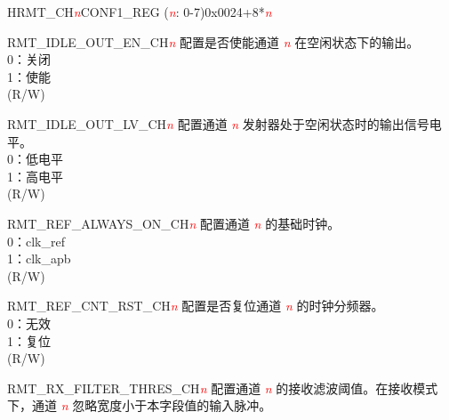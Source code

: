 \begin{register}{H}{RMT\_CH\textcolor{red}{\it{n}}CONF1\_REG (\textcolor{red}{\it{n}}: 0-7)}{0x0024+8*\textcolor{red}{\it{n}}}\label{regdesc:RMTCHnCONF1REG}
%
%
%
%
%
%
%
%
%
%
%
%
%
%
\regnewline%
\begin{regdesc}\begin{reglist}
\item [RMT\_IDLE\_OUT\_EN\_CH\textcolor{red}{\it{n}}] 配置是否使能通道 \textcolor{red}{\it{n}} 在空闲状态下的输出。\\
0：关闭\\
1：使能\\(R/W)
\item [RMT\_IDLE\_OUT\_LV\_CH\textcolor{red}{\it{n}}] 配置通道 \textcolor{red}{\it{n}} 发射器处于空闲状态时的输出信号电平。\\
0：低电平\\
1：高电平\\(R/W)
\item [RMT\_REF\_ALWAYS\_ON\_CH\textcolor{red}{\it{n}}] 配置通道 \textcolor{red}{\it{n}} 的基础时钟。\\
0：clk\_ref\\
1：clk\_apb\\(R/W)
\item [RMT\_REF\_CNT\_RST\_CH\textcolor{red}{\it{n}}] 配置是否复位通道 \textcolor{red}{\it{n}} 的时钟分频器。\\
0：无效\\
1：复位\\(R/W)
\item [RMT\_RX\_FILTER\_THRES\_CH\textcolor{red}{\it{n}}] 配置通道 \textcolor{red}{\it{n}} 的接收滤波阈值。在接收模式下，通道 \textcolor{red}{\it{n}} 忽略宽度小于本字段值的输入脉冲。\\

\end{reglist}
\end{regdesc}
\end{register}
